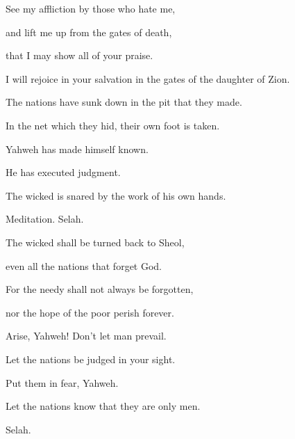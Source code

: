 {\par }{\QB See my affliction by those who hate me,
\par }{\Q and lift me up from the gates of death,
\par }{\QB {}that I may show all of your praise.
\par }{\QB I will rejoice in your salvation in the gates of the daughter of Zion.
\par }{\Q {}The nations have sunk down in the pit that they made.
\par }{\QB In the net which they hid, their own foot is taken.
\par }{\Q {}Yahweh has made himself known.
\par }{\QB He has executed judgment.
\par }{\QB The wicked is snared by the work of his own hands.
\par }{\QS Meditation. Selah.\par }
{\Q {}The wicked shall be turned back to Sheol,
\par }{\QB even all the nations that forget God.
\par }{\Q {}For the needy shall not always be forgotten,
\par }{\QB nor the hope of the poor perish forever.
\par }{\Q {}Arise, Yahweh! Don’t let man prevail.
\par }{\QB Let the nations be judged in your sight.
\par }{\Q {}Put them in fear, Yahweh.
\par }{\QB Let the nations know that they are only men.
\par }{\QS Selah.\par }

